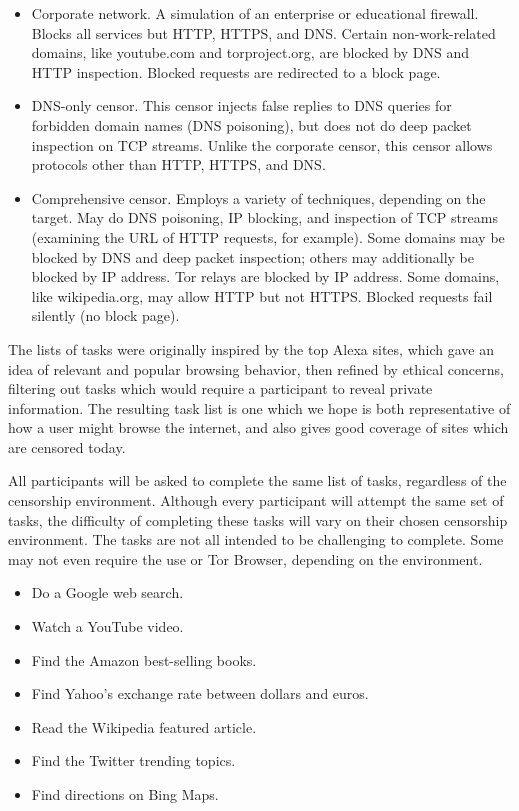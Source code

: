 \documentclass{sig-alternate-hotpets15}
\begin{document}
\begin{itemize} \itemsep1pt \parskip0pt 
\item{Corporate network.}
A simulation of an enterprise or educational firewall.
Blocks all services but HTTP, HTTPS, and DNS.
Certain non-work-related domains, like youtube.com and torproject.org,
are blocked by DNS and HTTP inspection.
Blocked requests are redirected to a block page.
\item{DNS-only censor.}
This censor injects false replies to DNS queries
for forbidden domain names (DNS poisoning),
but does not do deep packet inspection on TCP streams.
Unlike the corporate censor, this censor allows protocols
other than HTTP, HTTPS, and DNS.
\item{Comprehensive censor.}
Employs a variety of techniques, depending on the target.
May do DNS poisoning, IP blocking, and inspection of TCP streams
(examining the URL of HTTP requests, for example).
Some domains may be blocked by DNS and deep packet inspection;
others may additionally be blocked by IP address.
Tor relays are blocked by IP address.
Some domains, like wikipedia.org, may allow HTTP but not HTTPS.
Blocked requests fail silently (no block page).
\end{itemize}

The lists of tasks were originally inspired by the top Alexa sites, which gave an idea of relevant and popular browsing behavior, then refined by ethical concerns, filtering out tasks which would require a participant to reveal private information. The resulting task list is one which we hope is both representative of how a user might browse the internet, and also gives good coverage of sites which are censored today.

All participants will be asked to complete the same list of tasks, regardless of the censorship environment. Although every participant will attempt the same set of tasks, the difficulty of completing these tasks will vary on their chosen censorship environment. The tasks are not all intended to be challenging to complete. Some may not even require the use or Tor Browser, depending on the environment. 

\begin{itemize} \itemsep1pt \parskip0pt 
\item Do a Google web search.
\item Watch a YouTube video.
\item Find the Amazon best-selling books.
\item Find Yahoo's exchange rate between dollars and euros.
\item Read the Wikipedia featured article.
\item Find the Twitter trending topics.
\item Find directions on Bing Maps.
\end{itemize}
\end{document}
